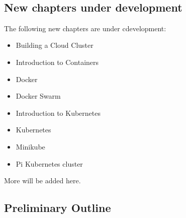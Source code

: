 \FILENAME\

\subsection{New chapters under
development}\label{new-chapters-under-development}

The following new chapters are under cdevelopment:

\begin{itemize}
\item Building a Cloud Cluster
\item Introduction to Containers
\item Docker
\item Docker Swarm
\item Introduction to Kubernetes
\item Kubernetes
\item Minikube
\item Pi Kubernetes cluster
\end{itemize}

More will be added here.

\subsection{Preliminary Outline}\label{preliminary-outline}

